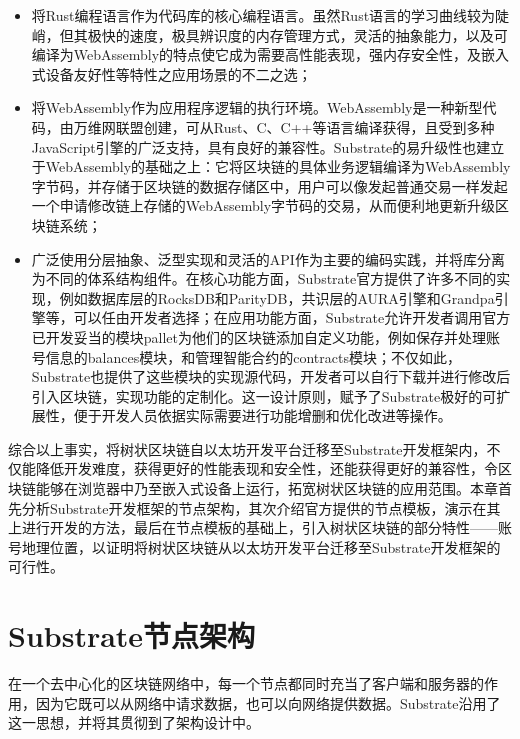 \begin{itemize}
    \item 将Rust编程语言作为代码库的核心编程语言。虽然Rust语言的学习曲线较为陡峭，但其极快的速度，极具辨识度的内存管理方式，灵活的抽象能力，以及可编译为WebAssembly的特点使它成为需要高性能表现，强内存安全性，及嵌入式设备友好性等特性之应用场景的不二之选；
    \item 将WebAssembly作为应用程序逻辑的执行环境。WebAssembly是一种新型代码，由万维网联盟创建，可从Rust、C、C++等语言编译获得，且受到多种JavaScript引擎的广泛支持，具有良好的兼容性\cite{wasmIntro}。Substrate的易升级性也建立于WebAssembly的基础之上：它将区块链的具体业务逻辑编译为WebAssembly字节码，并存储于区块链的数据存储区中，用户可以像发起普通交易一样发起一个申请修改链上存储的WebAssembly字节码的交易，从而便利地更新升级区块链系统；
    \item 广泛使用分层抽象、泛型实现和灵活的API作为主要的编码实践，并将库分离为不同的体系结构组件。在核心功能方面，Substrate官方提供了许多不同的实现，例如数据库层的RocksDB和ParityDB，共识层的AURA引擎和Grandpa引擎等，可以任由开发者选择；在应用功能方面，Substrate允许开发者调用官方已开发妥当的模块pallet为他们的区块链添加自定义功能，例如保存并处理账号信息的balances模块，和管理智能合约的contracts模块；不仅如此，Substrate也提供了这些模块的实现源代码，开发者可以自行下载并进行修改后引入区块链，实现功能的定制化。这一设计原则，赋予了Substrate极好的可扩展性，便于开发人员依据实际需要进行功能增删和优化改进等操作。
\end{itemize}

综合以上事实，将树状区块链自以太坊开发平台迁移至Substrate开发框架内，不仅能降低开发难度，获得更好的性能表现和安全性，还能获得更好的兼容性，令区块链能够在浏览器中乃至嵌入式设备上运行，拓宽树状区块链的应用范围。本章首先分析Substrate开发框架的节点架构，其次介绍官方提供的节点模板，演示在其上进行开发的方法，最后在节点模板的基础上，引入树状区块链的部分特性——账号地理位置，以证明将树状区块链从以太坊开发平台迁移至Substrate开发框架的可行性。

\section{Substrate节点架构}

在一个去中心化的区块链网络中，每一个节点都同时充当了客户端和服务器的作用，因为它既可以从网络中请求数据，也可以向网络提供数据。Substrate沿用了这一思想，并将其贯彻到了架构设计中。

